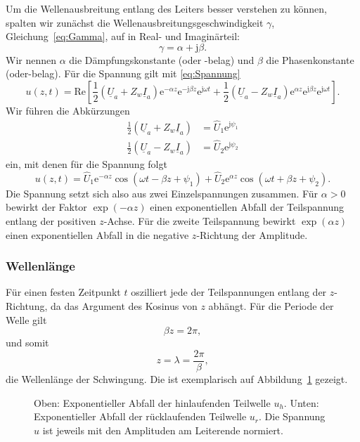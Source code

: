 \documentclass[paper=a4, parskip=half-, ngerman, fontsize=11pt]{scrreprt}
\begin{document}
Um die Wellenausbreitung entlang des Leiters besser verstehen zu können, spalten wir zunächst die
Wellenausbreitungsgeschwindigkeit $\gamma$, Gleichung~\eqref{eq:Gamma}, auf in Real- und Imaginärteil:
\[ \gamma = \alpha + \mathrm{j} \beta. \] Wir nennen $\alpha$ die Dämpfungskonstante (oder -belag) und $\beta$ die
Phasenkonstante (oder-belag). Für die Spannung gilt mit \eqref{eq:Spannung}
\begin{equation}
u(z, t) = \mathrm{Re} \left[
\frac{1}{2} \left( \underline{U}_{a} + Z_{w} \underline{I}_{a} \right) \mathrm{e}^{- \alpha z}
\mathrm{e}^{- \mathrm{j} \beta z} \mathrm{e}^{\mathrm{j} \omega t}
+
\frac{1}{2} \left( \underline{U}_{a} - Z_{w} \underline{I}_{a} \right) \mathrm{e}^{\alpha z}
\mathrm{e}^{\mathrm{j} \beta z} \mathrm{e}^{\mathrm{j} \omega t}
\right].
\end{equation}
Wir führen die Abkürzungen
\begin{align*}
\frac{1}{2} \left( \underline{U}_{a} + Z_{w} \underline{I}_{a} \right) &= \hat{U}_{1} \mathrm{e}^{\mathrm{j} \psi_{1}}
\\[1ex]
\frac{1}{2} \left( \underline{U}_{a} - Z_{w} \underline{I}_{a} \right) &= \hat{U}_{2} \mathrm{e}^{\mathrm{j} \psi_{2}}
\end{align*}
ein, mit denen für die Spannung folgt
\begin{equation}
u(z,t) =
\hat{U}_{1} \mathrm{e}^{- \alpha z} \cos \left( \omega t - \beta z + \psi_{1} \right)
+
\hat{U}_{2} \mathrm{e}^{\alpha z} \cos \left( \omega t + \beta z + \psi_{2} \right).
\end{equation}
Die Spannung setzt sich also aus zwei Einzelspannungen zusammen. Für $\alpha > 0$ bewirkt der Faktor $\exp(-\alpha z)$
einen exponentiellen Abfall der Teilspannung entlang der positiven $z$-Achse. Für die zweite Teilspannung bewirkt
$\exp(\alpha z)$ einen exponentiellen Abfall in die negative $z$-Richtung der Amplitude.

\subsubsection{Wellenlänge}

Für einen festen Zeitpunkt $t$ oszilliert jede der Teilspannungen entlang der $z$-Richtung, da das Argument des Kosinus
von $z$ abhängt. Für die Periode der Welle gilt \[ \beta z = 2 \pi, \] und somit
\[ z = \lambda = \frac{2 \pi}{\beta}, \] die Wellenlänge der Schwingung. Die ist exemplarisch auf
Abbildung~\ref{ExpWelle} gezeigt.
\begin{figure}[!htb]
    \begin{center}
        
        \caption{Oben: Exponentieller Abfall der hinlaufenden Teilwelle $u_{h}$. Unten: Exponentieller Abfall der
        rücklaufenden Teilwelle $u_{r}$. Die Spannung $u$ ist jeweils mit den Amplituden am Leiterende normiert.}
        \label{ExpWelle}
    \end{center}
\end{figure}
\end{document}
